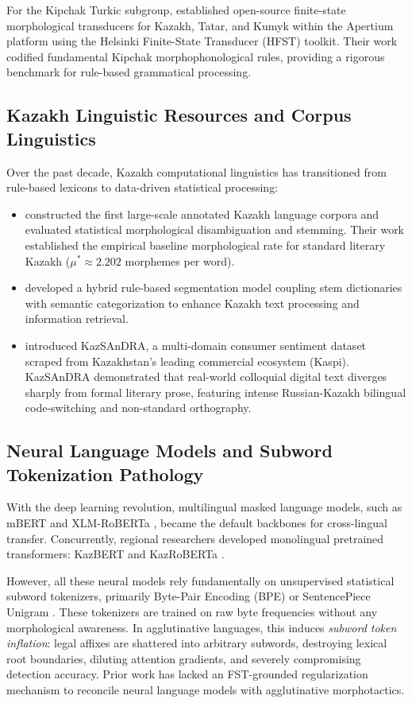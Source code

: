 For the Kipchak Turkic subgroup, \citet{tyers2016finite} established open-source finite-state morphological transducers for Kazakh, Tatar, and Kumyk within the Apertium platform using the Helsinki Finite-State Transducer (HFST) toolkit. Their work codified fundamental Kipchak morphophonological rules, providing a rigorous benchmark for rule-based grammatical processing.

\subsection{Kazakh Linguistic Resources and Corpus Linguistics}
Over the past decade, Kazakh computational linguistics has transitioned from rule-based lexicons to data-driven statistical processing:
\begin{itemize}
    \item \citet{makhambetov2013kazakh,makhambetov2015data} constructed the first large-scale annotated Kazakh language corpora and evaluated statistical morphological disambiguation and stemming. Their work established the empirical baseline morphological rate for standard literary Kazakh ($\mu^* \approx 2.202$ morphemes per word).
    \item \citet{bekmanova2021kazakh} developed a hybrid rule-based segmentation model coupling stem dictionaries with semantic categorization to enhance Kazakh text processing and information retrieval.
    \item \citet{yeshpanov2024kazsandra} introduced KazSAnDRA, a multi-domain consumer sentiment dataset scraped from Kazakhstan's leading commercial ecosystem (Kaspi). KazSAnDRA demonstrated that real-world colloquial digital text diverges sharply from formal literary prose, featuring intense Russian-Kazakh bilingual code-switching and non-standard orthography.
\end{itemize}

\subsection{Neural Language Models and Subword Tokenization Pathology}
With the deep learning revolution, multilingual masked language models, such as mBERT \citep{devlin2019bert} and XLM-RoBERTa \citep{conneau2020xlmr}, became the default backbones for cross-lingual transfer. Concurrently, regional researchers developed monolingual pretrained transformers: KazBERT \citep{eraly2021kazbert} and KazRoBERTa \citep{sagyndyk2025kazroberta}.

However, all these neural models rely fundamentally on unsupervised statistical subword tokenizers, primarily Byte-Pair Encoding (BPE) \citep{sennrich2016subword} or SentencePiece Unigram \citep{kudo2018sentencepiece}. These tokenizers are trained on raw byte frequencies without any morphological awareness. In agglutinative languages, this induces \textit{subword token inflation}: legal affixes are shattered into arbitrary subwords, destroying lexical root boundaries, diluting attention gradients, and severely compromising detection accuracy. Prior work has lacked an FST-grounded regularization mechanism to reconcile neural language models with agglutinative morphotactics.

